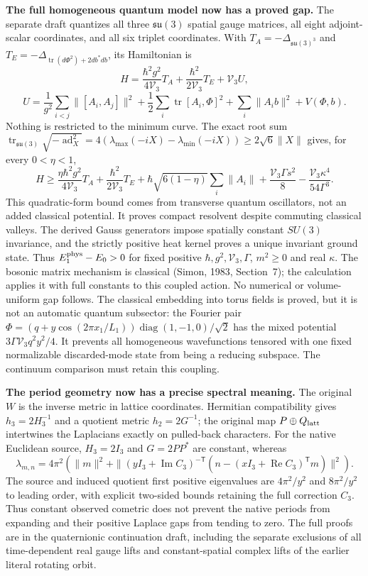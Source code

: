 \documentclass[10pt,letterpaper]{article}
\begin{document}
\noindent\textbf{The full homogeneous quantum model now has a proved gap.}
The separate draft 
quantizes all three $\mathfrak{su}(3)$ spatial gauge matrices, all eight
adjoint-scalar coordinates, and all six triplet coordinates. With
$T_A=-\Delta_{\mathfrak{su}(3)^3}$ and
$T_E=-\Delta_{\operatorname{tr}(d\Phi^2)+2db^*db}$, its Hamiltonian is
\[
 H=\frac{\hbar^2g^2}{4\mathcal V_3}T_A+
       \frac{\hbar^2}{2\mathcal V_3}T_E+\mathcal V_3U,
\]
\[
 U=\frac1{g^2}\sum_{i<j}\|[A_i,A_j]\|^2
   +\frac12\sum_i\operatorname{tr}[A_i,\Phi]^2
   +\sum_i\|A_i b\|^2+V(\Phi,b).
\]
Nothing is restricted to the minimum curve. The exact root sum
$\operatorname{tr}_{\mathfrak{su}(3)}\sqrt{-\operatorname{ad}_X^2}
=4(\lambda_{\max}(-iX)-\lambda_{\min}(-iX))\geq2\sqrt6\|X\|$
gives, for every $0<\eta<1$,
\[
 H\geq\frac{\eta\hbar^2g^2}{4\mathcal V_3}T_A+
 \frac{\hbar^2}{2\mathcal V_3}T_E+
 \hbar\sqrt{6(1-\eta)}\sum_i\|A_i\|
 +\frac{\mathcal V_3\Gamma s^2}{8}
 -\frac{\mathcal V_3\kappa^4}{54\Gamma^3}.
\]
This quadratic-form bound comes from transverse quantum oscillators,
not an added classical potential. It proves compact resolvent despite
commuting classical valleys. The derived Gauss generators impose
spatially constant $SU(3)$ invariance, and the strictly positive heat
kernel proves a unique invariant ground state. Thus
$E^{\rm phys}_1-E_0>0$ for fixed positive
$\hbar,g^2,\mathcal V_3,\Gamma$, $m^2\geq0$ and real $\kappa$.
The bosonic matrix mechanism is classical (Simon, 1983, Section~7);
the calculation applies it with full constants to this coupled action.
No numerical or volume-uniform gap follows. The classical embedding
into torus fields is proved, but it is not an automatic quantum
subsector: the Fourier pair
$\Phi=(q+y\cos(2\pi x_1/L_1))\operatorname{diag}(1,-1,0)/\sqrt2$
has the mixed potential $3\Gamma\mathcal V_3q^2y^2/4$. It prevents
all homogeneous wavefunctions tensored with one fixed normalizable
discarded-mode state from being a reducing subspace. The continuum
comparison must retain this coupling.

\noindent\textbf{The period geometry now has a precise spectral meaning.}
The original $W$ is the inverse metric in lattice coordinates.
Hermitian compatibility gives $h_3=2H_3^{-1}$ and a quotient metric
$h_2=2G^{-1}$; the original map $P\oplus Q_{\rm latt}$ intertwines
the Laplacians exactly on pulled-back characters. For the native
Euclidean source, $H_3=2I_3$ and $G=2PP^*$ are constant, whereas
\[
 \lambda_{m,n}=4\pi^2\left(\|m\|^2+
       \|(yI_3+\operatorname{Im}C_3)^{-\mathsf T}
          (n-(xI_3+\operatorname{Re}C_3)^{\mathsf T}m)\|^2\right).
\]
The source and induced quotient first positive eigenvalues are
$4\pi^2/y^2$ and $8\pi^2/y^2$ to leading order, with explicit two-sided
bounds retaining the full correction $C_3$. Thus constant observed
cometric does not prevent the native periods from expanding and their
positive Laplace gaps from tending to zero.
The full proofs are in the quaternionic continuation draft, including
the separate exclusions of all time-dependent real gauge lifts and
constant-spatial complex lifts of the earlier literal rotating orbit.
\end{document}
